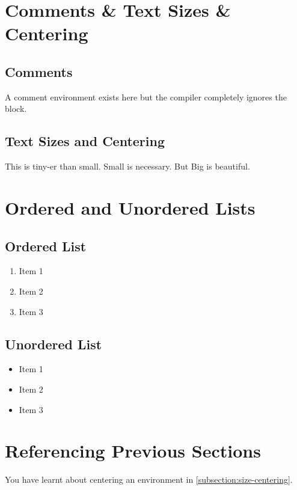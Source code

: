 \documentclass[a4paper,10pt]{article} %
\begin{document}

\section{Comments \& Text Sizes \& Centering}

\subsection{Comments}
A comment environment exists here but the compiler completely ignores the block.

\subsection{Text Sizes and Centering} \label{subsection:size-centering}

\begin{center}
    \tiny  This is tiny-er than small. 
    \small Small is necessary.
    \large But \Large Big \LARGE is \Huge beautiful.
\end{center}

\section{Ordered and Unordered Lists}

\newpage
\subsection{Ordered List}
\begin{enumerate}
    \item Item 1
    \item Item 2
    \item Item 3
\end{enumerate}

\subsection{Unordered List}
\begin{itemize}
    \item Item 1
    \item Item 2
    \item Item 3
\end{itemize}

\section{Referencing Previous Sections}
You have learnt about centering an environment in \autoref{subsection:size-centering}.
\end{document}
